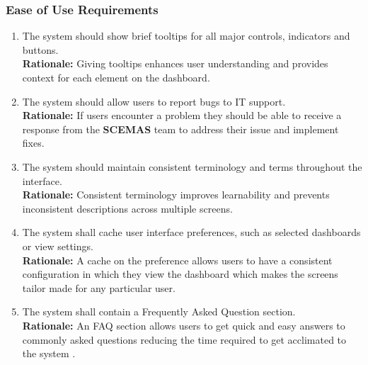 \documentclass[]{article}
\begin{document}
\subsubsection{Ease of Use Requirements}
\label{ssub:ease_of_use_requirements}
\begin{enumerate}[{UH-EOU}1. ]
	\item The system should show brief tooltips for all major controls, indicators and buttons.\\
	\textbf{Rationale:} Giving tooltips enhances user understanding and provides context for each element on the dashboard.
	\item The system should allow users to report bugs to IT support.\\
	\textbf{Rationale:} If users encounter a problem they should be able to receive a response from the \textbf{SCEMAS} team to address their issue and implement fixes.
	\item The system should maintain consistent terminology and terms throughout the interface.\\
	\textbf{Rationale:} Consistent terminology improves learnability and prevents inconsistent descriptions across multiple screens.
	\item The system shall cache user interface preferences, such as selected dashboards or view settings.\\
	\textbf{Rationale:} A cache on the preference allows users to have a consistent configuration in which they view the dashboard which makes the screens tailor made for any particular user.
	\item The system shall contain a Frequently Asked Question section.\\
	\textbf{Rationale:} An FAQ section allows users to get quick and easy answers to commonly asked questions reducing the time required to get acclimated to the system \cite{murphy2025}.
\end{enumerate}
\end{document}
